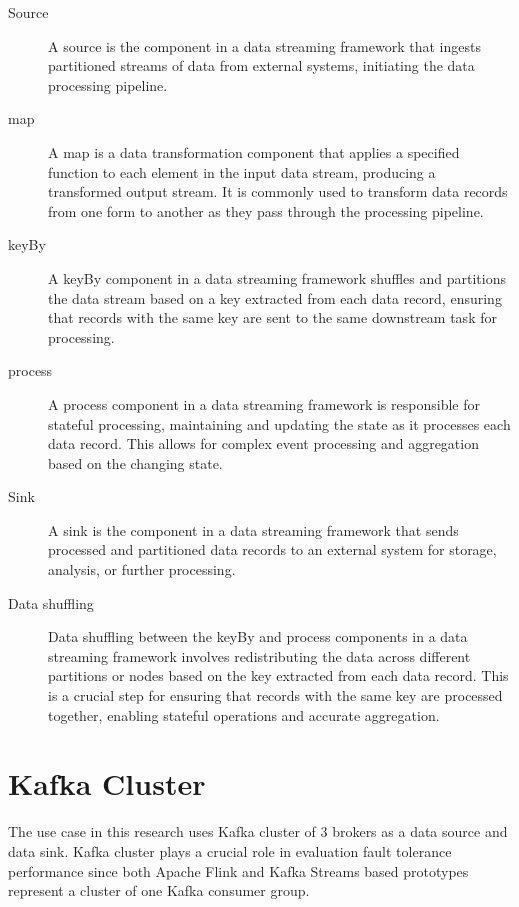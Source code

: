\begin{description}
    \item[Source] A source is the component in a data streaming framework that ingests partitioned streams of data from external systems,
    initiating the data processing pipeline.
    \item[map] A map is a data transformation component that applies a specified function to each element in the input data stream, producing a transformed output stream.
    It is commonly used to transform data records from one form to another as they pass through the processing pipeline.
    \item[keyBy] A keyBy component in a data streaming framework shuffles and partitions the data stream based on a key extracted from each data record,
    ensuring that records with the same key are sent to the same downstream task for processing.
    \item[process] A process component in a data streaming framework is responsible for stateful processing, maintaining and
    updating the state as it processes each data record.
    This allows for complex event processing and aggregation based on the changing state.
    \item[Sink] A sink is the component in a data streaming framework that sends processed and
    partitioned data records to an external system for storage, analysis, or further processing.
    \item[Data shuffling] Data shuffling between the keyBy and process components in a data streaming framework
    involves redistributing the data across different partitions or nodes based on the key extracted from each data record.
    This is a crucial step for ensuring that records with the same key are processed together,
    enabling stateful operations and accurate aggregation.
\end{description}


\newpage
\section{Kafka Cluster}\label{sec:kafka-as-a-data-provider:-challenges}
The use case in this research uses Kafka cluster of 3 brokers as a
data source and data sink.
Kafka cluster plays a crucial role in evaluation fault tolerance performance
since both Apache Flink and Kafka Streams based prototypes represent a
cluster of one Kafka consumer group.

